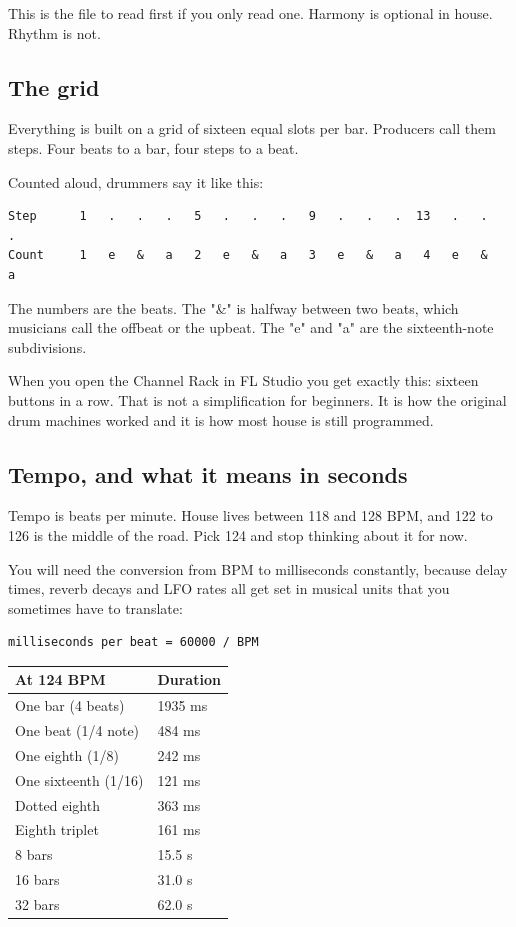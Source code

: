This is the file to read first if you only read one. Harmony is optional in house. Rhythm
is not.

\subsection{The grid}\label{th03_rhythm-the-grid}

Everything is built on a grid of sixteen equal slots per bar. Producers call them steps.
Four beats to a bar, four steps to a beat.

Counted aloud, drummers say it like this:

\begin{verbatim}
Step      1   .   .   .   5   .   .   .   9   .   .   .  13   .   .   .
Count     1   e   &   a   2   e   &   a   3   e   &   a   4   e   &   a
\end{verbatim}

The numbers are the beats. The "\&" is halfway between two beats, which musicians call the
offbeat or the upbeat. The "e" and "a" are the sixteenth-note subdivisions.

When you open the Channel Rack in FL Studio you get exactly this: sixteen buttons in a row.
That is not a simplification for beginners. It is how the original drum machines worked and
it is how most house is still programmed.

\subsection{Tempo, and what it means in seconds}\label{th03_rhythm-tempo-and-what-it-means-in-seconds}

Tempo is beats per minute. House lives between 118 and 128 BPM, and 122 to 126 is the
middle of the road. Pick 124 and stop thinking about it for now.

You will need the conversion from BPM to milliseconds constantly, because delay times,
reverb decays and LFO rates all get set in musical units that you sometimes have to
translate:

\begin{verbatim}
milliseconds per beat = 60000 / BPM
\end{verbatim}

{\def\LTcaptype{none} %
\begin{longtable}[]{@{}ll@{}}
\toprule\noalign{}
At 124 BPM & Duration \\
\midrule\noalign{}
\endhead
\bottomrule\noalign{}
\endlastfoot
One bar (4 beats) & 1935 ms \\
One beat (1/4 note) & 484 ms \\
One eighth (1/8) & 242 ms \\
One sixteenth (1/16) & 121 ms \\
Dotted eighth & 363 ms \\
Eighth triplet & 161 ms \\
8 bars & 15.5 s \\
16 bars & 31.0 s \\
32 bars & 62.0 s \\
\end{longtable}
}

